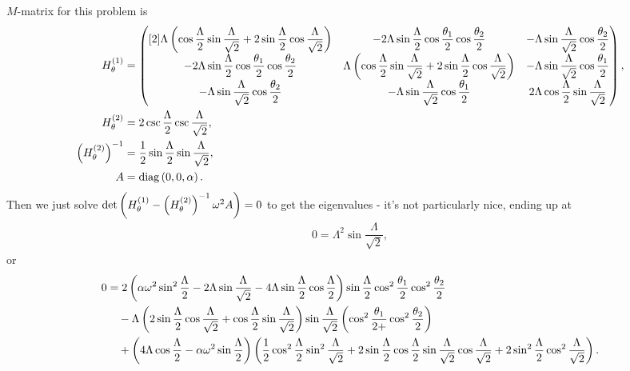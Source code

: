 $M$-matrix for this problem is
\begin{align*}
	H_{\theta}^{(1)} &= 
	\begin{pmatrix}[2]
		\Lambda\left(  \cos\dfrac{\Lambda}{2}\sin\dfrac{\Lambda}{\sqrt{2}} + 2\sin\dfrac{\Lambda}{2}\cos\dfrac{\Lambda}{\sqrt{2}}  \right) &
		-2\Lambda\sin\dfrac{\Lambda}{2}\cos\dfrac{\theta_1}{2}\cos\dfrac{\theta_2}{2} &
		-\Lambda\sin\dfrac{\Lambda}{\sqrt{2}}\cos\dfrac{\theta_2}{2} \\
		-2\Lambda\sin\dfrac{\Lambda}{2}\cos\dfrac{\theta_1}{2}\cos\dfrac{\theta_2}{2} &
		\Lambda\left(  \cos\dfrac{\Lambda}{2}\sin\dfrac{\Lambda}{\sqrt{2}} + 2\sin\dfrac{\Lambda}{2}\cos\dfrac{\Lambda}{\sqrt{2}}  \right) &
		-\Lambda\sin\dfrac{\Lambda}{\sqrt{2}}\cos\dfrac{\theta_1}{2} \\
		-\Lambda\sin\dfrac{\Lambda}{\sqrt{2}}\cos\dfrac{\theta_2}{2} &
		-\Lambda\sin\dfrac{\Lambda}{\sqrt{2}}\cos\dfrac{\theta_1}{2} &
		2\Lambda\cos\dfrac{\Lambda}{2}\sin\dfrac{\Lambda}{\sqrt{2}}
	\end{pmatrix}, \\
	H_{\theta}^{(2)} &= 2\csc\dfrac{\Lambda}{2}\csc\dfrac{\Lambda}{\sqrt{2}}, \\
	\left(  H_{\theta}^{(2)}  \right)^{-1} &= \frac{1}{2}\sin\dfrac{\Lambda}{2}\sin\dfrac{\Lambda}{\sqrt{2}}, \\
	A &= \mathrm{diag}\left( 0, 0, \alpha \right).
\end{align*}
Then we just solve $\det\left( H_{\theta}^{(1)} - \left(  H_{\theta}^{(2)}  \right)^{-1}\omega^2 A \right)=0$ to get the eigenvalues - it's not particularly nice, ending up at
\begin{align*}
	0 = \Lambda^2\sin\dfrac{\Lambda}{\sqrt{2}},
\end{align*}
or
\begin{align*}
	0 &= 2\left( \alpha\omega^2\sin^2\dfrac{\Lambda}{2} - 2\Lambda\sin\dfrac{\Lambda}{\sqrt{2}} - 4\Lambda\sin\dfrac{\Lambda}{2}\cos\dfrac{\Lambda}{2}  \right)\sin\dfrac{\Lambda}{2}\cos^2\dfrac{\theta_1}{2}\cos^2\dfrac{\theta_2}{2} \\
	&\quad - \Lambda\left(  2\sin\dfrac{\Lambda}{2}\cos\dfrac{\Lambda}{\sqrt{2}} + \cos\dfrac{\Lambda}{2}\sin\dfrac{\Lambda}{\sqrt{2}}  \right)\sin\dfrac{\Lambda}{\sqrt{2}} \left( \cos^2\dfrac{\theta_1}{2 + }\cos^2\dfrac{\theta_2}{2} \right) \\
	&\quad + \left( 4\Lambda\cos\dfrac{\Lambda}{2} - \alpha\omega^2\sin\dfrac{\Lambda}{2} \right) \left(  \frac{1}{2}\cos^2\dfrac{\Lambda}{2}\sin^2\dfrac{\Lambda}{\sqrt{2}} + 2\sin\dfrac{\Lambda}{2}\cos\dfrac{\Lambda}{2}\sin\dfrac{\Lambda}{\sqrt{2}}\cos\dfrac{\Lambda}{\sqrt{2}} + 2\sin^2\dfrac{\Lambda}{2}\cos^2\dfrac{\Lambda}{\sqrt{2}}  \right).
\end{align*}

